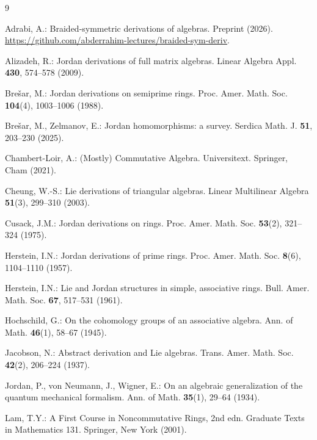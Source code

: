 \documentclass[]{interact}
\theoremstyle{plain}
\theoremstyle{definition}
\theoremstyle{remark}
\begin{document}
\begin{thebibliography}{9}

Adrabi, A.: Braided-symmetric derivations of algebras. Preprint (2026). \url{https://github.com/abderrahim-lectures/braided-sym-deriv}.

Alizadeh, R.: Jordan derivations of full matrix algebras. Linear Algebra Appl. \textbf{430}, 574--578 (2009).

Bre\v{s}ar, M.: Jordan derivations on semiprime rings. Proc. Amer. Math. Soc. \textbf{104}(4), 1003--1006 (1988).

Bre\v{s}ar, M., Zelmanov, E.: Jordan homomorphisms: a survey. Serdica Math. J. \textbf{51}, 203--230 (2025).

Chambert-Loir, A.: (Mostly) Commutative Algebra. Universitext. Springer, Cham (2021).

Cheung, W.-S.: Lie derivations of triangular algebras. Linear Multilinear Algebra \textbf{51}(3), 299--310 (2003).

Cusack, J.M.: Jordan derivations on rings. Proc. Amer. Math. Soc. \textbf{53}(2), 321--324 (1975).

Herstein, I.N.: Jordan derivations of prime rings. Proc. Amer. Math. Soc. \textbf{8}(6), 1104--1110 (1957).

Herstein, I.N.: Lie and Jordan structures in simple, associative rings. Bull. Amer. Math. Soc. \textbf{67}, 517--531 (1961).

Hochschild, G.: On the cohomology groups of an associative algebra. Ann. of Math. \textbf{46}(1), 58--67 (1945).

Jacobson, N.: Abstract derivation and Lie algebras. Trans. Amer. Math. Soc. \textbf{42}(2), 206--224 (1937).

Jordan, P., von Neumann, J., Wigner, E.: On an algebraic generalization of the quantum mechanical formalism. Ann. of Math. \textbf{35}(1), 29--64 (1934).

Lam, T.Y.: A First Course in Noncommutative Rings, 2nd edn. Graduate Texts in Mathematics 131. Springer, New York (2001).


\end{thebibliography}
\end{document}
